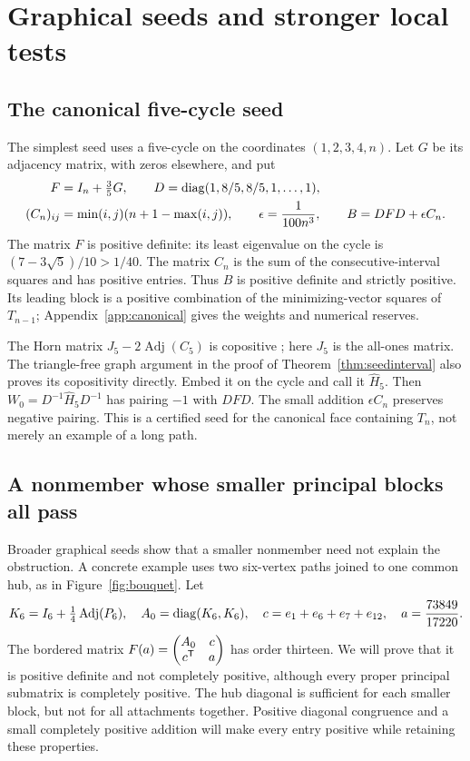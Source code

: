 \section{Graphical seeds and stronger local tests}\label{sec:seeds}
\subsection{The canonical five-cycle seed}\label{sec:canonicalseed}
The simplest seed uses a five-cycle on the coordinates $(1,2,3,4,n)$. Let $G$ be its adjacency matrix, with zeros elsewhere, and put
\begin{equation}\label{eq:canonicalseed}
\begin{split}
 F&=I_n+\tfrac35G,\qquad D=\operatorname{diag}(1,8/5,8/5,1,\ldots,1),\\
 (C_n)_{ij}&=\min(i,j)(n+1-\max(i,j)),\qquad
 \epsilon=\frac1{100n^3},\qquad B=DFD+\epsilon C_n.
\end{split}
\end{equation}
The matrix $F$ is positive definite: its least eigenvalue on the cycle is $(7-3\sqrt5)/10>1/40$. The matrix $C_n$ is the sum of the consecutive-interval squares and has positive entries. Thus $B$ is positive definite and strictly positive. Its leading block is a positive combination of the minimizing-vector squares of $T_{n-1}$; Appendix~\ref{app:canonical} gives the weights and numerical reserves.

The Horn matrix $J_5-2\operatorname{Adj}(C_5)$ is copositive \cite{HN,SZ}; here $J_5$ is the all-ones matrix. The triangle-free graph argument in the proof of Theorem~\ref{thm:seedinterval} also proves its copositivity directly. Embed it on the cycle and call it $\widehat H_5$. Then
$W_0=D^{-1}\widehat H_5D^{-1}$ has pairing $-1$ with $DFD$. The small addition $\epsilon C_n$ preserves negative pairing. This is a certified seed for the canonical face containing $T_n$, not merely an example of a long path.

\subsection{A nonmember whose smaller principal blocks all pass}
Broader graphical seeds show that a smaller nonmember need not explain the obstruction. A concrete example uses two six-vertex paths joined to one common hub, as in Figure~\ref{fig:bouquet}. Let
\begin{equation}\label{eq:thirteen}
 K_6=I_6+\tfrac14\operatorname{Adj}(P_6),\quad
 A_0=\operatorname{diag}(K_6,K_6),\quad c=e_1+e_6+e_7+e_{12},\quad
 a=\frac{73849}{17220}.
\end{equation}
The bordered matrix $F(a)=\begin{pmatrix}A_0&c\\c^{\mathsf T}&a\end{pmatrix}$ has order thirteen. We will prove that it is positive definite and not completely positive, although every proper principal submatrix is completely positive. The hub diagonal is sufficient for each smaller block, but not for all attachments together. Positive diagonal congruence and a small completely positive addition will make every entry positive while retaining these properties.

